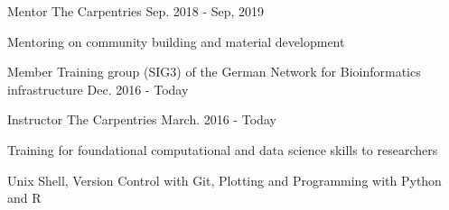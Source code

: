 \begin{cventries}
  \cventry
    {Mentor} %
    {The Carpentries} %
    {} %
    {Sep. 2018 - Sep, 2019} %
    {
      \begin{cvitems} %
        \item {Mentoring on community building and material development}
      \end{cvitems}
    }

  \cventry
    {Member} %
    {Training group (SIG3) of the German Network for Bioinformatics infrastructure} %
    {} %
    {Dec. 2016 - Today} %
    {}

  \cventry
    {Instructor} %
    {The Carpentries} %
    {} %
    {March. 2016 - Today} %
    {
      \begin{cvitems} %
        \item {Training for foundational computational and data science skills to researchers}
        \item {Unix Shell, Version Control with Git, Plotting and Programming with Python and R}
      \end{cvitems}
    }
\end{cventries}
